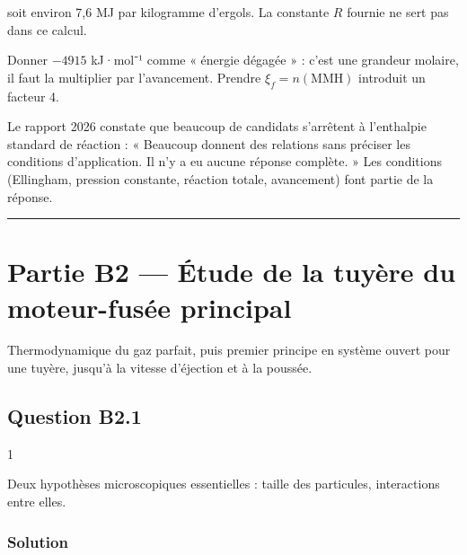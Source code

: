 \documentclass[11pt,a4paper]{article}
\newcommand{\equationajustee}[1]{%
  \sbox{\boiteequation}{$\displaystyle #1$}%
  \ifdim\wd\boiteequation>\linewidth
    \[\resizebox{\linewidth}{!}{\usebox{\boiteequation}}\]%
  \else
    \[#1\]%
  \fi}
\begin{document}
\equationajustee{\boxed{Q \approx 2{,}8\times10^{10}\ \mathrm{J}}}

soit environ 7,6 MJ par kilogramme d'ergols. La constante \(R\) fournie ne sert pas dans ce calcul.

\begin{piege}

Donner \(-4915\) kJ·mol⁻¹ comme « énergie dégagée » : c'est une grandeur molaire, il faut la multiplier par l'avancement. Prendre \(\xi_f = n(\mathrm{MMH})\) introduit un facteur 4.

\end{piege}

\begin{jury}

Le rapport 2026 constate que beaucoup de candidats s'arrêtent à l'enthalpie standard de réaction : « Beaucoup donnent des relations sans préciser les conditions d'application. Il n'y a eu aucune réponse complète. » Les conditions (Ellingham, pression constante, réaction totale, avancement) font partie de la réponse.

\end{jury}

\begin{center}\rule{0.5\linewidth}{0.5pt}\end{center}

\hypertarget{partie-b2-uxe9tude-de-la-tuyuxe8re-du-moteur-fusuxe9e-principal}{%
\section{Partie B2 --- Étude de la tuyère du moteur-fusée principal}\label{partie-b2-uxe9tude-de-la-tuyuxe8re-du-moteur-fusuxe9e-principal}}

Thermodynamique du gaz parfait, puis premier principe en système ouvert pour une tuyère, jusqu'à la vitesse d'éjection et à la poussée.

\hypertarget{question-b2.1}{%
\subsection{Question B2.1}\label{question-b2.1}}

\begin{indication}{1}

Deux hypothèses microscopiques essentielles : taille des particules, interactions entre elles.

\end{indication}

\hypertarget{solution-29}{%
\subsubsection{Solution}\label{solution-29}}
\end{document}
